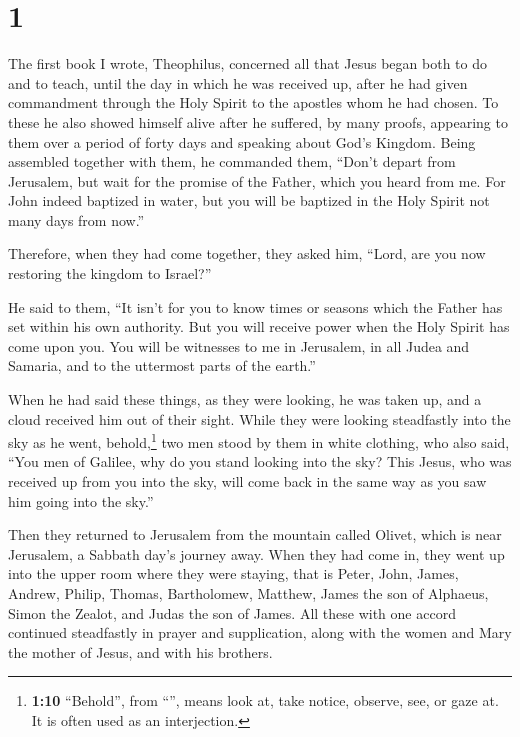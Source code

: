 \hypertarget{section}{%
\section{1}\label{section}}

 The first book I wrote, Theophilus, concerned all that
Jesus began both to do and to teach,  until the day in
which he was received up, after he had given commandment through the
Holy Spirit to the apostles whom he had chosen.  To these
he also showed himself alive after he suffered, by many proofs,
appearing to them over a period of forty days and speaking about God's
Kingdom.  Being assembled together with them, he commanded
them, ``Don't depart from Jerusalem, but wait for the promise of the
Father, which you heard from me.  For John indeed baptized
in water, but you will be baptized in the Holy Spirit not many days from
now.''

 Therefore, when they had come together, they asked him,
``Lord, are you now restoring the kingdom to Israel?''

 He said to them, ``It isn't for you to know times or
seasons which the Father has set within his own authority.
 But you will receive power when the Holy Spirit has come
upon you. You will be witnesses to me in Jerusalem, in all Judea and
Samaria, and to the uttermost parts of the earth.''

 When he had said these things, as they were looking, he
was taken up, and a cloud received him out of their sight.
 While they were looking steadfastly into the sky as he
went, behold,\footnote{\textbf{1:10} ``Behold'', from ``'',
  means look at, take notice, observe, see, or gaze at. It is often used
  as an interjection.} two men stood by them in white clothing,
 who also said, ``You men of Galilee, why do you stand
looking into the sky? This Jesus, who was received up from you into the
sky, will come back in the same way as you saw him going into the sky.''

 Then they returned to Jerusalem from the mountain called
Olivet, which is near Jerusalem, a Sabbath day's journey away.
 When they had come in, they went up into the upper room
where they were staying, that is Peter, John, James, Andrew, Philip,
Thomas, Bartholomew, Matthew, James the son of Alphaeus, Simon the
Zealot, and Judas the son of James.  All these with one
accord continued steadfastly in prayer and supplication, along with the
women and Mary the mother of Jesus, and with his brothers.

